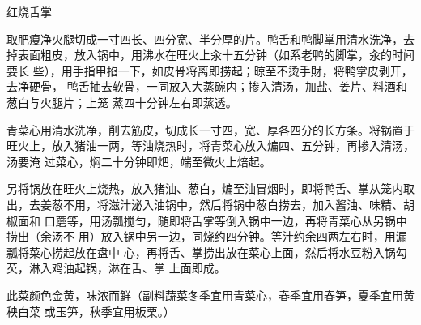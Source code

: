 \begin{recipe}{红烧舌掌}

\ingredients


\preparation

\step 取肥痩净火腿切成一寸四长、四分宽、半分厚的片。鸭舌和鸭脚掌用清水洗净，去
掉表面粗皮，放入锅中，用沸水在旺火上汆十五分钟（如系老鸭的脚掌，汆的时间要长
些），用手指甲掐一下，如皮骨将离即捞起；晾至不烫手財，将鸭掌皮剥开，去净硬骨，
鸭舌抽去软骨，一同放入大蒸碗内；掺入清汤，加盐、姜片、料酒和葱白与火腿片；上笼
蒸四十分钟左右即蒸透。

\step 青菜心用清水洗净，削去筋皮，切成长一寸四，宽、厚各四分的长方条。将锅置于
旺火上，放入猪油一两，等油烧热时，将青菜心放入煸四、五分钟，再掺入清汤，汤要淹
过菜心，焖二十分钟即𤆵，端至微火上焙起。

\step 另将锅放在旺火上烧热，放入猪油、葱白，煸至油冒烟时，即将鸭舌、掌从笼内取
出，去姜葱不用，将滋汁泌入油锅中，然后将锅中葱白捞去，加入酱油、味精、胡椒面和
口蘑等，用汤瓢搅匀，随即将舌掌等倒入锅中一边，再将青菜心从另锅中捞出（余汤不
用）放入锅中另一边，同烧约四分钟。等汁约余四两左右时，用漏瓢将菜心捞起放在盘中
心，再将舌、掌捞出放在菜心上面，然后将水豆粉入锅勾芡，淋入鸡油起锅，淋在舌、掌
上面即成。

\features

此菜颜色金黄，味浓而鲜（副料蔬菜冬季宜用青菜心，春季宜用春笋，夏季宜用黄秧白菜
或玉笋，秋季宜用板栗。）

\end{recipe}

